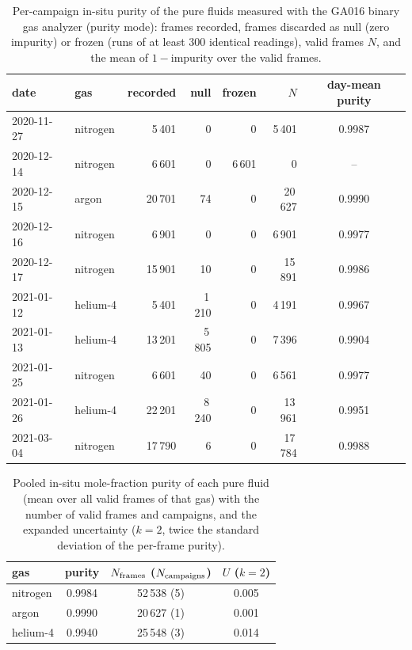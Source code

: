 \begin{table}[h]
  \centering
  \caption{\label{tab:si_purity_day}Per-campaign in-situ purity of the pure fluids measured with the GA016 binary gas analyzer (purity mode): frames recorded, frames discarded as null (zero impurity) or frozen (runs of at least 300 identical readings), valid frames $N$, and the mean of $1-\text{impurity}$ over the valid frames.}
  \begin{tabular}{llrrrrc}
    \toprule
    date & gas & recorded & null & frozen & $N$ & day-mean purity \\
    \midrule
    2020-11-27 & nitrogen & 5\,401 & 0 & 0 & 5\,401 & 0.9987 \\
    2020-12-14 & nitrogen & 6\,601 & 0 & 6\,601 & 0 & -- \\
    2020-12-15 & argon & 20\,701 & 74 & 0 & 20\,627 & 0.9990 \\
    2020-12-16 & nitrogen & 6\,901 & 0 & 0 & 6\,901 & 0.9977 \\
    2020-12-17 & nitrogen & 15\,901 & 10 & 0 & 15\,891 & 0.9986 \\
    2021-01-12 & helium-4 & 5\,401 & 1\,210 & 0 & 4\,191 & 0.9967 \\
    2021-01-13 & helium-4 & 13\,201 & 5\,805 & 0 & 7\,396 & 0.9904 \\
    2021-01-25 & nitrogen & 6\,601 & 40 & 0 & 6\,561 & 0.9977 \\
    2021-01-26 & helium-4 & 22\,201 & 8\,240 & 0 & 13\,961 & 0.9951 \\
    2021-03-04 & nitrogen & 17\,790 & 6 & 0 & 17\,784 & 0.9988 \\
    \bottomrule
  \end{tabular}
\end{table}

\begin{table}[h]
  \centering
  \caption{\label{tab:si_purity_gas}Pooled in-situ mole-fraction purity of each pure fluid (mean over all valid frames of that gas) with the number of valid frames and campaigns, and the expanded uncertainty ($k = 2$, twice the standard deviation of the per-frame purity).}
  \begin{tabular}{lccc}
    \toprule
    gas & purity & $N_{\rm frames}$ ($N_{\rm campaigns}$) & $U$ ($k = 2$) \\
    \midrule
    nitrogen & 0.9984 & 52\,538 (5) & 0.005 \\
    argon & 0.9990 & 20\,627 (1) & 0.001 \\
    helium-4 & 0.9940 & 25\,548 (3) & 0.014 \\
    \bottomrule
  \end{tabular}
\end{table}
